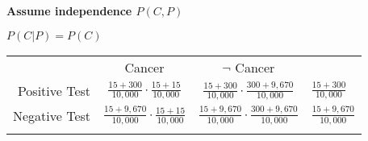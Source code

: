 \textbf{Assume independence $P(C, P)$}

$P(C|P) = P(C)$

\begin{tabular}{ r|c|c|l }
\multicolumn{1}{r}{}
      &  \multicolumn{1}{c}{Cancer}
               &  \multicolumn{1}{c}{$\neg$ Cancer} \\
               \cline{2-3}
Positive Test  & $\frac{15+300}{10,000}\cdot\frac{15+15}{10,000}$   & $\frac{15+300}{10,000}\cdot\frac{300+9,670}{10,000}$  & $\frac{15+300}{10,000}$\\ 
               \cline{2-3}
Negative Test  & $\frac{15+9,670}{10,000}\cdot\frac{15+15}{10,000}$ & $\frac{15+9,670}{10,000}\cdot\frac{300+9,670}{10,000}$ & $\frac{15+9,670}{10,000}$\\
               \cline{2-3}
\multicolumn{1}{r}{} 
      & \multicolumn{1}{c}{} 
              & \multicolumn{1}{c}{} 
                      & \multicolumn{1}{c}{}\\
\end{tabular}


